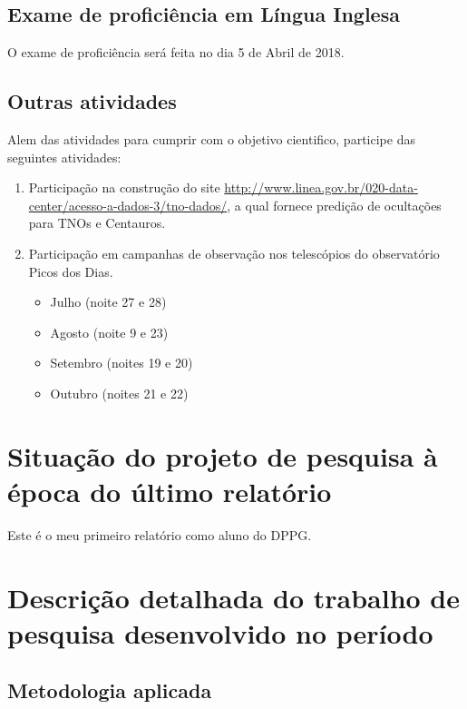 \documentclass[a4paper, 11pt]{article}
\begin{document}
\subsection{Exame de profici\^encia em L\'ingua Inglesa}

O exame de proficiência será feita no dia 5 de Abril de 2018.

\subsection{Outras atividades}

Alem das atividades para cumprir com o objetivo cientifico, participe das seguintes atividades:

\begin{enumerate}
  \item Participação na construção do site \url{http://www.linea.gov.br/020-data-center/acesso-a-dados-3/tno-dados/}, a qual fornece predição de ocultações para TNOs e Centauros. 
  \item Participação em campanhas de observação nos telescópios do observatório Picos dos Dias. 
  \begin{itemize}
    \item Julho (noite 27 e 28)
    \item Agosto (noite 9 e 23) %
    \item Setembro (noites 19 e 20)
    \item Outubro (noites 21 e 22)
  \end{itemize}
\end{enumerate}
\section{Situação do projeto de pesquisa à época do último relatório}
Este é o meu primeiro relatório como aluno do DPPG.
\section{Descrição detalhada do trabalho de pesquisa desenvolvido no período}

\subsection{Metodologia aplicada}
\end{document}

